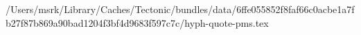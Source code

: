 /Users/msrk/Library/Caches/Tectonic/bundles/data/6ffe055852f8faf66c0acbe1a7fb27f87b869a90bad1204f3bf4d9683f597c7c/hyph-quote-pms.tex